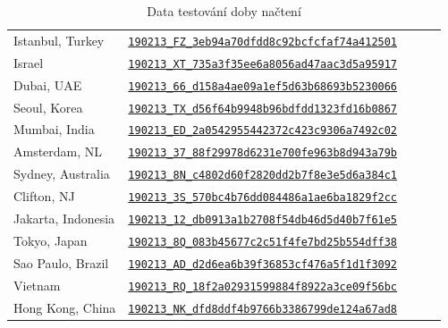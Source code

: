 \documentclass[a4paper, 12pt]{article}
\begin{document}
\begin{table}[H]
\begin{tabular}{*5l}
    Istanbul, Turkey        & \href{https://www.webpagetest.org/result/190213_FZ_3eb94a70dfdd8c92bcfcfaf74a412501}{\texttt{190213\_FZ\_3eb94a70dfdd8c92bcfcfaf74a412501}} \\
    Israel                  & \href{https://www.webpagetest.org/result/190213_XT_735a3f35ee6a8056ad47aac3d5a95917}{\texttt{190213\_XT\_735a3f35ee6a8056ad47aac3d5a95917}} \\
    Dubai, UAE              & \href{https://www.webpagetest.org/result/190213_66_d158a4ae09a1ef5d63b68693b5230066}{\texttt{190213\_66\_d158a4ae09a1ef5d63b68693b5230066}} \\
    Seoul, Korea            & \href{https://www.webpagetest.org/result/190213_TX_d56f64b9948b96bdfdd1323fd16b0867}{\texttt{190213\_TX\_d56f64b9948b96bdfdd1323fd16b0867}} \\
    Mumbai, India           & \href{https://www.webpagetest.org/result/190213_ED_2a0542955442372c423c9306a7492c02}{\texttt{190213\_ED\_2a0542955442372c423c9306a7492c02}} \\
    Amsterdam, NL           & \href{https://www.webpagetest.org/result/190213_37_88f29978d6231e700fe963b8d943a79b}{\texttt{190213\_37\_88f29978d6231e700fe963b8d943a79b}} \\
    Sydney, Australia       & \href{https://www.webpagetest.org/result/190213_8N_c4802d60f2820dd2b7f8e3e5d6a384c1}{\texttt{190213\_8N\_c4802d60f2820dd2b7f8e3e5d6a384c1}} \\
    Clifton, NJ             & \href{https://www.webpagetest.org/result/190213_3S_570bc4b76dd084486a1ae6ba1829f2cc}{\texttt{190213\_3S\_570bc4b76dd084486a1ae6ba1829f2cc}} \\
    Jakarta, Indonesia      & \href{https://www.webpagetest.org/result/190213_12_db0913a1b2708f54db46d5d40b7f61e5}{\texttt{190213\_12\_db0913a1b2708f54db46d5d40b7f61e5}} \\
    Tokyo, Japan            & \href{https://www.webpagetest.org/result/190213_8Q_083b45677c2c51f4fe7bd25b554dff38}{\texttt{190213\_8Q\_083b45677c2c51f4fe7bd25b554dff38}} \\
    Sao Paulo, Brazil       & \href{https://www.webpagetest.org/result/190213_AD_d2d6ea6b39f36853cf476a5f1d1f3092}{\texttt{190213\_AD\_d2d6ea6b39f36853cf476a5f1d1f3092}} \\
    Vietnam                 & \href{https://www.webpagetest.org/result/190213_RQ_18f2a02931599884f8922a3ce09f56bc}{\texttt{190213\_RQ\_18f2a02931599884f8922a3ce09f56bc}} \\
    Hong Kong, China        & \href{https://www.webpagetest.org/result/190213_NK_dfd8ddf4b9766b3386799de124a67ad8}{\texttt{190213\_NK\_dfd8ddf4b9766b3386799de124a67ad8}} \\ \bottomrule \hline
  \end{tabular}
  \label{tab:Data testování doby načtení}
  \caption{Data testování doby načtení}
\end{table}
\end{document}
